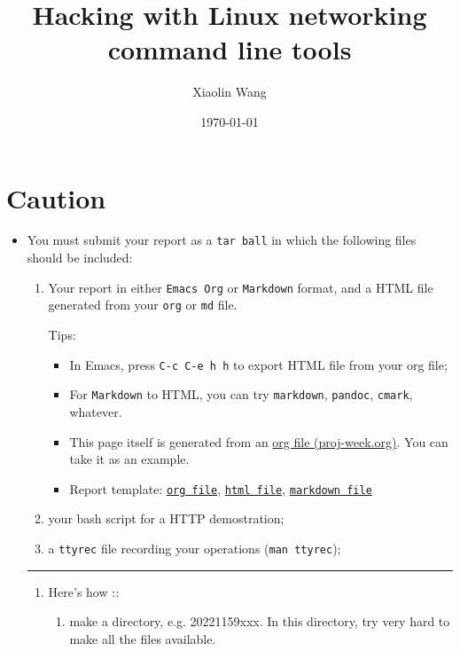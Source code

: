 \documentclass{article} [NO-DEFAULT-PACKAGES] \usepackage{wx672hyperref}
\author{Xiaolin Wang}
\date{\today}
\title{Hacking with Linux networking command line tools}
\begin{document}
\maketitle
\tableofcontents


\section{Caution}
\label{sec:orgbcfde5a}
\begin{itemize}
\item You must submit your report as a \texttt{tar ball} in which the following files should be
included:

\begin{enumerate}
\item Your report in either \texttt{Emacs Org} or \texttt{Markdown} format, and a HTML file
generated from your \texttt{org} or \texttt{md} file.

Tips: 
\begin{itemize}
\item In Emacs, press \texttt{C-c C-e h h} to export HTML file from your org file;

\item For \texttt{Markdown} to HTML, you can try \texttt{markdown}, \texttt{pandoc}, \texttt{cmark}, whatever.

\item This page itself is generated from an \href{proj-week.org}{org file (proj-week.org)}. You can take it
as an example.

\item Report template: \href{20221159xxx.org}{\texttt{org file}}, \href{20221159xxx.html}{\texttt{html file}}, \href{20221159xxx.md}{\texttt{markdown file}}
\end{itemize}

\item your bash script for a HTTP demostration;

\item a \texttt{ttyrec} file recording your operations (\texttt{man ttyrec});
\end{enumerate}

\noindent\rule{\textwidth}{0.5pt}
\begin{enumerate}
\item Here's how :: 
\begin{enumerate}
\item make a directory, e.g. 20221159xxx. In this directory, try very hard to make all
the files available.


\end{enumerate}
\end{enumerate}
\end{itemize}
\end{document}
